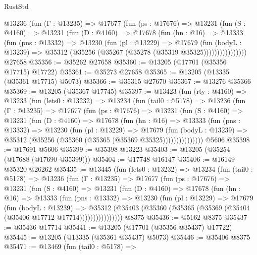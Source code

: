 \begin{lexlean}{RustStd}
\begin{coremodule}
          @13236
            (fun (Γ : @13235) =>
            @17677
              (fun (ps : @17676) =>
              @13231
                (fun (S : @4160) =>
                @13231
                  (fun (D : @4160) =>
                  @17678
                    (fun (hn : @16) =>
                    @13333
                      (fun (pns : @13332) =>
                      @13230
                        (fun (pl : @13229) =>
                        @17679
                          (fun (bodyL : @13239) =>
                          @35312 (@35256 (@35267 (@35278 (@35319 @35325))))))))))))))))
    @27658
@35356 := @35262 @27658
@35360 := @13205 (@17701 (@35356 @17715) @17722)
@35361 := @35273 @27658
@35365 := @13205 (@13335 (@35361 @17715) @5073)
@35366 := @35315 @27670
@35367 := @13276 @35366
@35369 := @13205 (@35367 @17745)
@35397 := @13423
    (fun (rty : @4160) =>
    @13233
      (fun (lets0 : @13232) =>
      @13234
        (fun (tail0 : @5178) =>
        @13236
          (fun (Γ : @13235) =>
          @17677
            (fun (ps : @17676) =>
            @13231
              (fun (S : @4160) =>
              @13231
                (fun (D : @4160) =>
                @17678
                  (fun (hn : @16) =>
                  @13333
                    (fun (pns : @13332) =>
                    @13230
                      (fun (pl : @13229) =>
                      @17679
                        (fun (bodyL : @13239) =>
                        @35312 (@35256 (@35360 (@35365 (@35369 @35325)))))))))))))))
    @5606
@35398 := @17691 @5606
@35399 := @35398 @13223
@35403 := @13205 (@35254 (@17688 (@17690 @35399)))
@35404 := @17748 @16147
@35406 := @16149 @35320 @26262
@35435 := @13445
    (fun (lets0 : @13232) =>
    @13234
      (fun (tail0 : @5178) =>
      @13236
        (fun (Γ : @13235) =>
        @17677
          (fun (ps : @17676) =>
          @13231
            (fun (S : @4160) =>
            @13231
              (fun (D : @4160) =>
              @17678
                (fun (hn : @16) =>
                @13333
                  (fun (pns : @13332) =>
                  @13230
                    (fun (pl : @13229) =>
                    @17679
                      (fun (bodyL : @13239) =>
                      @35312
                        (@35403
                          (@35360 (@35365 (@35369 (@35404 (@35406 @17712 @17714))))))))))))))))
    @8375
@35436 := @5162 @8375
@35437 := @35436 @17714
@35441 := @13205 (@17701 (@35356 @35437) @17722)
@35445 := @13205 (@13335 (@35361 @35437) @5073)
@35446 := @35406 @8375
@35471 := @13469
    (fun (tail0 : @5178) =>

\end{coremodule}
\end{lexlean}
